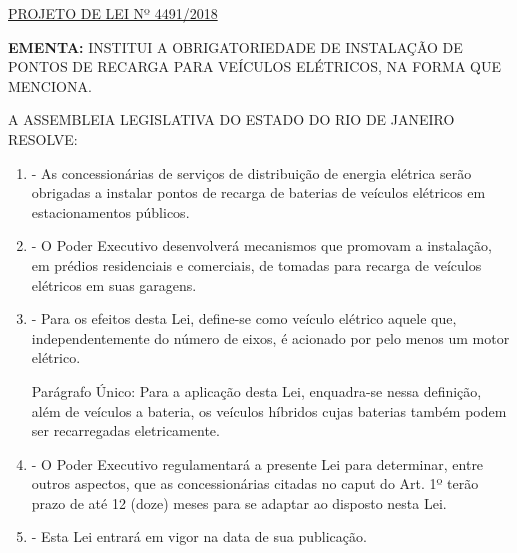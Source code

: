 \documentclass[10pt]{article}
\date{}
\begin{document}
\maketitle
\begin{center}
  \huge
  \vspace{-3cm}\href{http://alerjln1.alerj.rj.gov.br/scpro1519.nsf/f4b46b3cdbba990083256cc900746cf6/eb451c5dac7839350325834d0058b41e?OpenDocument}{PROJETO DE LEI Nº 4491/2018}
\bigskip
\bigskip
\bigskip
  
\end{center}

\textbf{EMENTA:} 
INSTITUI A OBRIGATORIEDADE DE INSTALAÇÃO DE PONTOS DE RECARGA PARA VEÍCULOS ELÉTRICOS, NA FORMA QUE MENCIONA.








\bigskip

\noindent
A ASSEMBLEIA LEGISLATIVA DO ESTADO DO RIO DE JANEIRO RESOLVE:

\begin{enumerate}[label=Art. \arabic*\textdegree]

\item - As concessionárias de serviços de distribuição de energia elétrica serão obrigadas a instalar pontos de recarga de baterias de veículos elétricos em estacionamentos públicos.

\item - O Poder Executivo desenvolverá mecanismos que promovam a instalação, em prédios residenciais e comerciais, de tomadas para recarga de veículos elétricos em suas garagens.

\item - Para os efeitos desta Lei, define-se como veículo elétrico aquele que, independentemente do número de eixos, é acionado por pelo menos um motor elétrico.

Parágrafo Único: Para a aplicação desta Lei, enquadra-se nessa definição, além de veículos a bateria, os veículos híbridos cujas baterias também podem ser recarregadas eletricamente.

\item - O Poder Executivo regulamentará a presente Lei para determinar, entre outros aspectos, que as concessionárias citadas no caput do Art. 1º terão prazo de até 12 (doze) meses para se adaptar ao disposto nesta Lei.

\item - Esta Lei entrará em vigor na data de sua publicação.


\end{enumerate}
\end{document}
